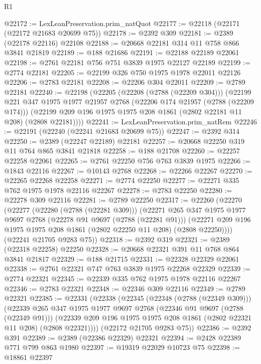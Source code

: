 \begin{lexlean}{R1}
\begin{coremodule}
@22172 := LexLeanPreservation.prim_natQuot
@22177 := @22118 (@22171 (@22172 @21683 @20699 @75))
@22178 := @2392 @309
@22181 := @2389 (@22178 @22116) @22108
@22188 := @20668 @22181 @314 @11 @758 @866 @3841 @21819
@22189 := @188 @21686
@22191 := @22188 @22189 @22061
@22198 := @2761 @22181 @756 @751 @3839 @1975 @22127 @22189
@22199 := @2774 @22181
@22205 := @22199 @326 @750 @1975 @1978 @22011 @22126
@22206 := @2783 @22181
@22208 := @22206 @304 @22011
@22209 := @2789 @22181
@22240 := @22198
    (@22205
      (@22208 (@2788 (@22209 @304)))
      (@22199
        @221
        @347
        @1975
        @1977
        @21957
        @2768
        (@22206 @174 @21957 (@2788 (@22209 @174)))
        (@22199 @209 @196 @1975 @1975 @208 @1861 (@2802 @22181 @11 @208) (@2808 @22181))))
@22241 := LexLeanPreservation.prim_natRem
@22246 := @22191 (@22240 (@22241 @21683 @20699 @75))
@22247 := @2392 @314
@22250 := @2389 (@22247 @22189) @22181
@22257 := @20668 @22250 @319 @11 @764 @865 @3841 @21818
@22258 := @188 @21708
@22260 := @22257 @22258 @22061
@22265 := @2761 @22250 @756 @763 @3839 @1975
@22266 := @1843 @22116
@22267 := @10143 @2768
@22268 := @22266 @22267
@22270 := @22265 @22268 @22258
@22271 := @2774 @22250
@22277 := @22271 @335 @762 @1975 @1978 @22116 @22267
@22278 := @2783 @22250
@22280 := @22278 @309 @22116
@22281 := @2789 @22250
@22317 := @22260
    (@22270
      (@22277
        (@22280 (@2788 (@22281 @309)))
        (@22271
          @265
          @347
          @1975
          @1977
          @9697
          @2768
          (@22278 @91 @9697 (@2788 (@22281 @91)))
          (@22271 @209 @196 @1975 @1975 @208 @1861 (@2802 @22250 @11 @208) (@2808 @22250))))
      (@22241 @21705 @9283 @75))
@22318 := @2392 @319
@22321 := @2389 (@22318 @22258) @22250
@22328 := @20668 @22321 @391 @11 @768 @864 @3841 @21817
@22329 := @188 @21715
@22331 := @22328 @22329 @22061
@22338 := @2761 @22321 @747 @763 @3839 @1975 @22268 @22329
@22339 := @2774 @22321
@22345 := @22339 @335 @762 @1975 @1978 @22116 @22267
@22346 := @2783 @22321
@22348 := @22346 @309 @22116
@22349 := @2789 @22321
@22385 := @22331
    (@22338
      (@22345
        (@22348 (@2788 (@22349 @309)))
        (@22339
          @265
          @347
          @1975
          @1977
          @9697
          @2768
          (@22346 @91 @9697 (@2788 (@22349 @91)))
          (@22339 @209 @196 @1975 @1975 @208 @1861 (@2802 @22321 @11 @208) (@2808 @22321))))
      (@22172 @21705 @9283 @75))
@22386 := @2392 @391
@22389 := @2389 (@22386 @22329) @22321
@22394 := @2428 @22389 @771 @799 @863 @1980
@22397 := @19319 @22029 @10723 @75
@22398 := @18861 @22397

\end{coremodule}
\end{lexlean}
